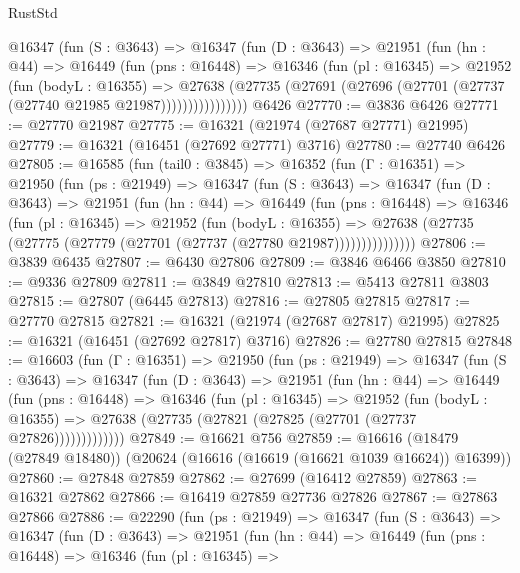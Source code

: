\begin{lexlean}{RustStd}
\begin{coremodule}
          @16347
            (fun (S : @3643) =>
            @16347
              (fun (D : @3643) =>
              @21951
                (fun (hn : @44) =>
                @16449
                  (fun (pns : @16448) =>
                  @16346
                    (fun (pl : @16345) =>
                    @21952
                      (fun (bodyL : @16355) =>
                      @27638
                        (@27735
                          (@27691 (@27696 (@27701 (@27737 (@27740 @21985 @21987))))))))))))))))
    @6426
@27770 := @3836 @6426
@27771 := @27770 @21987
@27775 := @16321 (@21974 (@27687 @27771) @21995)
@27779 := @16321 (@16451 (@27692 @27771) @3716)
@27780 := @27740 @6426
@27805 := @16585
    (fun (tail0 : @3845) =>
    @16352
      (fun (Γ : @16351) =>
      @21950
        (fun (ps : @21949) =>
        @16347
          (fun (S : @3643) =>
          @16347
            (fun (D : @3643) =>
            @21951
              (fun (hn : @44) =>
              @16449
                (fun (pns : @16448) =>
                @16346
                  (fun (pl : @16345) =>
                  @21952
                    (fun (bodyL : @16355) =>
                    @27638 (@27735 (@27775 (@27779 (@27701 (@27737 (@27780 @21987)))))))))))))))
@27806 := @3839 @6435
@27807 := @6430 @27806
@27809 := @3846 @6466 @3850
@27810 := @9336 @27809
@27811 := @3849 @27810
@27813 := @5413 @27811 @3803
@27815 := @27807 (@6445 @27813)
@27816 := @27805 @27815
@27817 := @27770 @27815
@27821 := @16321 (@21974 (@27687 @27817) @21995)
@27825 := @16321 (@16451 (@27692 @27817) @3716)
@27826 := @27780 @27815
@27848 := @16603
    (fun (Γ : @16351) =>
    @21950
      (fun (ps : @21949) =>
      @16347
        (fun (S : @3643) =>
        @16347
          (fun (D : @3643) =>
          @21951
            (fun (hn : @44) =>
            @16449
              (fun (pns : @16448) =>
              @16346
                (fun (pl : @16345) =>
                @21952
                  (fun (bodyL : @16355) =>
                  @27638 (@27735 (@27821 (@27825 (@27701 (@27737 @27826)))))))))))))
@27849 := @16621 @756
@27859 := @16616 (@18479 (@27849 @18480)) (@20624 (@16616 (@16619 (@16621 @1039 @16624)) @16399))
@27860 := @27848 @27859
@27862 := @27699 (@16412 @27859)
@27863 := @16321 @27862
@27866 := @16419 @27859 @27736 @27826
@27867 := @27863 @27866
@27886 := @22290
    (fun (ps : @21949) =>
    @16347
      (fun (S : @3643) =>
      @16347
        (fun (D : @3643) =>
        @21951
          (fun (hn : @44) =>
          @16449
            (fun (pns : @16448) =>
            @16346
              (fun (pl : @16345) =>

\end{coremodule}
\end{lexlean}
